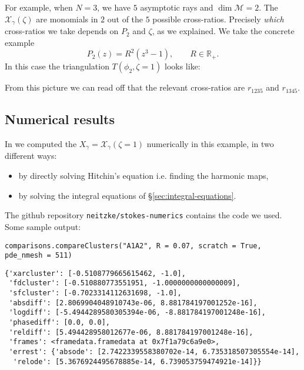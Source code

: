 \documentclass[12pt,letterpaper,reqno]{article}
\numberwithin{equation}{section}
\newcommand{\cM}{\ensuremath{\mathcal M}}
\newcommand{\cX}{\ensuremath{\mathcal X}}
\newcommand{\bbR}{\ensuremath{\mathbb R}}
\newcommand{\ti}[1]{\textit{#1}}
\newcommand{\insfig}[2]{

\medskip
\noindent
\begin{minipage}{\linewidth}

\makebox[\linewidth]{\texttt{[image: figures/\#1-crop.pdf]}}

\end{minipage}
\medskip

}
\begin{document}
For example, when $N=3$, we have $5$ asymptotic rays and $\dim \cM = 2$. The $\cX_\gamma(\zeta)$ are monomials in
$2$ out of the $5$ possible cross-ratios. 
Precisely \ti{which} cross-ratios we take depends on $P_2$ and $\zeta$, as we explained.
We take the concrete example
\begin{equation}
  P_2(z) = R^2 (z^3 - 1), \qquad R \in \bbR_+.
\end{equation}
In this case the triangulation $T(\phi_2, \zeta = 1)$ looks
like:
\insfig{higgs-metric-16}{0.8}
From this picture we can read off that the 
relevant cross-ratios are $r_{1235}$ and $r_{1345}$.

\subsection{Numerical results}

In \cite{DNexp} we computed the $X_\gamma = \cX_\gamma(\zeta = 1)$ numerically
in this example, in two different ways: 
\begin{itemize}
\item by
directly solving Hitchin's equation i.e. finding
the harmonic maps,
\item
by solving the integral equations of \S\ref{sec:integral-equations}.
\end{itemize}

The github repository {\tt neitzke/stokes-numerics} contains the code we used.
Some sample output:
\begin{verbatim}
comparisons.compareClusters("A1A2", R = 0.07, scratch = True, pde_nmesh = 511)
\end{verbatim}
\begin{verbatim}
{'xarcluster': [-0.5108779665615462, -1.0],
 'fdcluster': [-0.510880773551951, -1.0000000000000009],
 'sfcluster': [-0.7023314112631698, -1.0],
 'absdiff': [2.8069904048910743e-06, 8.881784197001252e-16],
 'logdiff': [-5.4944289580305394e-06, -8.881784197001248e-16],
 'phasediff': [0.0, 0.0],
 'reldiff': [5.494428958012677e-06, 8.881784197001248e-16],
 'frames': <framedata.framedata at 0x7f1a79c6a9e0>,
 'errest': {'absode': [2.7422339558380702e-14, 6.735318507305554e-14],
  'relode': [5.3676924495678885e-14, 6.739053759474921e-14]}}
\end{verbatim}
\end{document}
